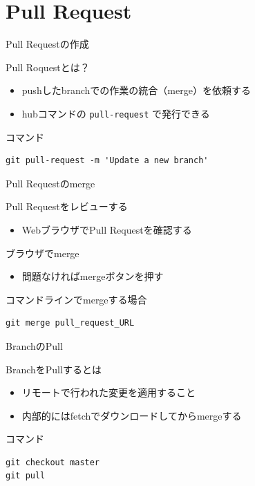 \documentclass[t, aspectratio=169]{beamer}
\begin{document}
\section{Pull Request}
\label{sec-3-4}
\begin{frame}[fragile,label=sec-3-4-1]{Pull Requestの作成}
 \begin{block}{Pull Roquestとは？}
\begin{itemize}
\item pushしたbranchでの作業の統合（merge）を依頼する
\item hubコマンドの \texttt{pull-request} で発行できる
\end{itemize}
\end{block}
\begin{block}{コマンド}
\begin{verbatim}
git pull-request -m 'Update a new branch'
\end{verbatim}
\end{block}
\end{frame}
\begin{frame}[fragile,label=sec-3-4-2]{Pull Requestのmerge}
 \begin{block}{Pull Requestをレビューする}
\begin{itemize}
\item WebブラウザでPull Requestを確認する
\end{itemize}
\end{block}

\begin{block}{ブラウザでmerge}
\begin{itemize}
\item 問題なければmergeボタンを押す
\end{itemize}
\end{block}

\begin{block}{コマンドラインでmergeする場合}
\begin{verbatim}
git merge pull_request_URL
\end{verbatim}
\end{block}
\end{frame}
\begin{frame}[fragile,label=sec-3-4-3]{BranchのPull}
 \begin{block}{BranchをPullするとは}
\begin{itemize}
\item リモートで行われた変更を適用すること
\item 内部的にはfetchでダウンロードしてからmergeする
\end{itemize}
\end{block}

\begin{block}{コマンド}
\begin{verbatim}
git checkout master
git pull
\end{verbatim}
\end{block}
\end{frame}
\end{document}
